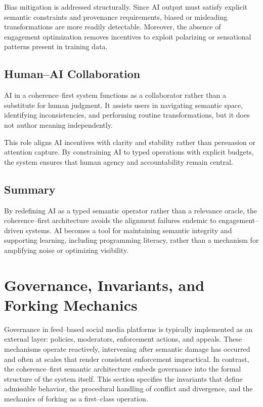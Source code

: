 \documentclass[11pt]{article}
\begin{document}
Bias mitigation is addressed structurally. Since AI output must satisfy explicit semantic
constraints and provenance requirements, biased or misleading transformations are more
readily detectable. Moreover, the absence of engagement optimization removes incentives to
exploit polarizing or sensational patterns present in training data.

\subsection{Human--AI Collaboration}

AI in a coherence--first system functions as a collaborator rather than a substitute for
human judgment. It assists users in navigating semantic space, identifying inconsistencies,
and performing routine transformations, but it does not author meaning independently.

This role aligns AI incentives with clarity and stability rather than persuasion or
attention capture. By constraining AI to typed operations with explicit budgets, the system
ensures that human agency and accountability remain central.

\subsection{Summary}

By redefining AI as a typed semantic operator rather than a relevance oracle, the
coherence--first architecture avoids the alignment failures endemic to engagement--driven
systems. AI becomes a tool for maintaining semantic integrity and supporting learning,
including programming literacy, rather than a mechanism for amplifying noise or optimizing
visibility.

\section{Governance, Invariants, and Forking Mechanics}

Governance in feed--based social media platforms is typically implemented as an external
layer: policies, moderators, enforcement actions, and appeals. These mechanisms operate
reactively, intervening after semantic damage has occurred and often at scales that render
consistent enforcement impractical. In contrast, the coherence--first semantic
architecture embeds governance into the formal structure of the system itself. This
section specifies the invariants that define admissible behavior, the procedural handling
of conflict and divergence, and the mechanics of forking as a first--class operation.
\end{document}
